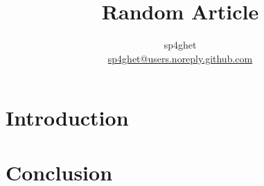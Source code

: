 \documentclass{article}
\title{Random Article}
\author{ sp4ghet \\ \href{mailto:sp4ghet@Users.noreply.github.com}{sp4ghet@users.noreply.github.com} }
\begin{document}
\maketitle

\begin{abstract}
 \lipsum[1]
\end{abstract}

\section{Introduction}
\lipsum[2-3]

\section{Conclusion}
\lipsum[3-4]
\end{document}
